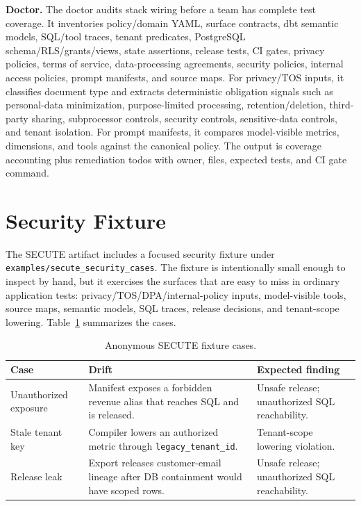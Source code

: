 \documentclass[sigconf,review,anonymous]{acmart}
\begin{document}
\textbf{Doctor.} The doctor audits stack wiring before a team has complete test
coverage. It inventories policy/domain YAML, surface contracts, dbt semantic
models, SQL/tool traces, tenant predicates, PostgreSQL schema/RLS/grants/views,
state assertions, release tests, CI gates, privacy policies, terms of service,
data-processing agreements, security policies, internal access policies, prompt
manifests, and source maps. For privacy/TOS inputs, it classifies document type
and extracts deterministic obligation signals such as personal-data
minimization, purpose-limited processing, retention/deletion, third-party
sharing, subprocessor controls, security controls, sensitive-data controls, and
tenant isolation. For prompt manifests, it compares model-visible metrics,
dimensions, and tools against the canonical policy. The output is coverage
accounting plus remediation todos with owner, files, expected tests, and CI gate
command.

\section{Security Fixture}

The SECUTE artifact includes a focused security fixture under
\texttt{examples/secute\_security\_cases}. The fixture is intentionally small
enough to inspect by hand, but it exercises the surfaces that are easy to miss in
ordinary application tests: privacy/TOS/DPA/internal-policy inputs,
model-visible tools, source maps, semantic models, SQL traces, release
decisions, and tenant-scope lowering. Table~\ref{tab:security-cases} summarizes
the cases.

\begin{table}[t]
\caption{Anonymous SECUTE fixture cases.}
\label{tab:security-cases}
\begin{tabular}{p{}p{}p{}}
\toprule
Case & Drift & Expected finding \\
\midrule
Unauthorized exposure & Manifest exposes a forbidden revenue alias that reaches
SQL and is released. & Unsafe release; unauthorized SQL reachability. \\
Stale tenant key & Compiler lowers an authorized metric through
\texttt{legacy\_tenant\_id}. & Tenant-scope lowering violation. \\
Release leak & Export releases customer-email lineage after DB containment
would have scoped rows. & Unsafe release; unauthorized SQL reachability. \\
\bottomrule
\end{tabular}
\end{table}
\end{document}
